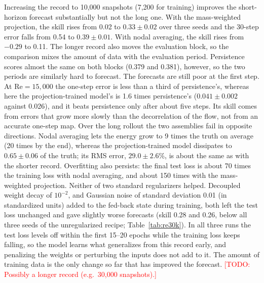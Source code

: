 \documentclass[conf]{new-aiaa}
\newcommand{\todo}[1]{\textcolor{red}{[TODO: #1]}}
\newcommand{\Rey}{\mathrm{Re}}
\begin{document}
Increasing the record to 10,000 snapshots (7,200 for training) improves the short-horizon forecast substantially but not the long one. With the mass-weighted projection, the skill rises from 0.02 to $0.33\pm0.02$ over three seeds and the 30-step error falls from 0.54 to $0.39\pm0.01$. With nodal averaging, the skill rises from $-0.29$ to 0.11. The longer record also moves the evaluation block, so the comparison mixes the amount of data with the evaluation period. Persistence scores almost the same on both blocks (0.379 and 0.381), however, so the two periods are similarly hard to forecast. The forecasts are still poor at the first step. At $\Rey=15{,}000$ the one-step error is less than a third of persistence's, whereas here the projection-trained model's is 1.6 times persistence's ($0.041\pm0.002$ against 0.026), and it beats persistence only after about five steps. Its skill comes from errors that grow more slowly than the decorrelation of the flow, not from an accurate one-step map. Over the long rollout the two assemblies fail in opposite directions. Nodal averaging lets the energy grow to 9 times the truth on average (20 times by the end), whereas the projection-trained model dissipates to $0.65\pm0.06$ of the truth; its RMS error, $29.0\pm2.6$\%, is about the same as with the shorter record. Overfitting also persists: the final test loss is about 70 times the training loss with nodal averaging, and about 150 times with the mass-weighted projection. Neither of two standard regularizers helped. Decoupled weight decay of $10^{-2}$, and Gaussian noise of standard deviation 0.01 (in standardized units) added to the fed-back state during training, both left the test loss unchanged and gave slightly worse forecasts (skill 0.28 and 0.26, below all three seeds of the unregularized recipe; Table~\ref{tab:re30k}). In all three runs the test loss levels off within the first 15--20 epochs while the training loss keeps falling, so the model learns what generalizes from this record early, and penalizing the weights or perturbing the inputs does not add to it. The amount of training data is the only change so far that has improved the forecast. \todo{Possibly a longer record (e.g.\ 30,000 snapshots).}
\end{document}
